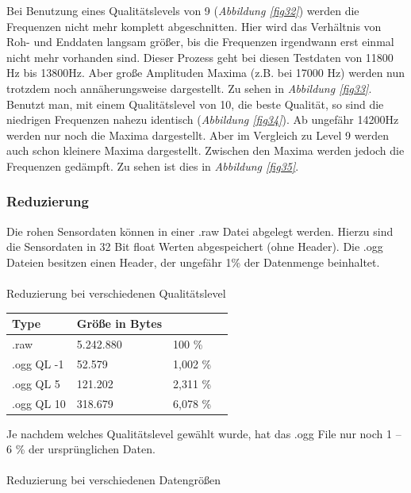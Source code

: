 \documentclass{article}
\begin{document}
			Bei Benutzung eines Qualitätslevels von 9 (\textit{Abbildung \ref{fig32}}) werden die Frequenzen nicht mehr komplett abgeschnitten. Hier wird das Verhältnis von Roh- und Enddaten langsam größer, bis die Frequenzen irgendwann erst einmal nicht mehr vorhanden sind. Dieser Prozess geht bei diesen Testdaten von 11800 Hz bis 13800Hz. Aber große Amplituden Maxima (z.B. bei 17000 Hz) werden nun trotzdem noch annäherungsweise dargestellt. Zu sehen in \textit{Abbildung \ref{fig33}}.
			Benutzt man, mit einem Qualitätslevel von 10, die beste Qualität, so sind die niedrigen Frequenzen nahezu identisch (\textit{Abbildung \ref{fig34}}). Ab ungefähr 14200Hz werden nur noch die Maxima dargestellt. Aber im Vergleich zu Level 9 werden auch schon kleinere Maxima dargestellt. Zwischen den Maxima werden jedoch die Frequenzen gedämpft. Zu sehen ist dies in \textit{Abbildung \ref{fig35}}.
		\subsubsection{Reduzierung}
			Die rohen Sensordaten können in einer .raw Datei abgelegt werden. Hierzu sind die Sensordaten in 32 Bit float Werten abgespeichert (ohne Header). Die .ogg Dateien besitzen einen Header, der ungefähr 1\% der Datenmenge beinhaltet.\\\\
			
			Reduzierung bei verschiedenen Qualitätslevel\\
			

			
			\begin{tabularx}{\textwidth}{p{}|l|l|l}
				Type 			& Größe in Bytes 		&  \\
				\hline
				.raw			& 5.242.880				& 100 \%		\\
				\hline
				\hline
				.ogg QL -1		& 52.579				& 1,002 \%\\
				\hline
				.ogg QL  5		& 121.202				& 2,311 \%	\\
				\hline
				.ogg QL 10		& 318.679				& 6,078 \%	\\
			\end{tabularx}
		

		
			Je nachdem welches Qualitätslevel gewählt wurde, hat das .ogg File nur noch 1 – 6 \% der ursprünglichen Daten.\\\\
			Reduzierung bei verschiedenen Datengrößen \\
			
\end{document}
